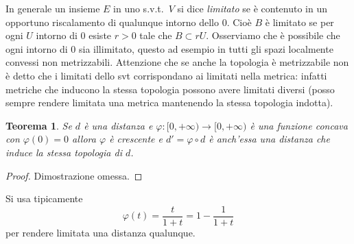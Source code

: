 \documentclass[italian,a4paper,oneside,headinclude]{scrbook}
\renewcommand{\phi}{\varphi}
\newtheorem{theorem}{Teorema}
\begin{document}
In generale un insieme $E$ in uno s.v.t.\ $V$ si dice \emph{limitato}
se è contenuto in un opportuno riscalamento di qualunque intorno dello
$0$.
Cioè $B$ è limitato se per ogni $U$ intorno di $0$ esiste $r>0$ tale
che $B\subset r U$.
Osserviamo che è possibile che ogni intorno di $0$ sia illimitato, questo
ad esempio in tutti gli spazi localmente convessi non metrizzabili.
Attenzione che se anche la topologia è metrizzabile non è detto che i
limitati dello svt corrispondano ai limitati nella metrica: infatti
metriche che inducono la stessa topologia possono avere limitati
diversi (posso sempre rendere limitata una metrica mantenendo la
stessa topologia indotta).

\begin{theorem}\label{th:distanza_concava}
  Se $d$ è una distanza e $\phi\colon[0,+\infty)\to[0,+\infty)$ è una
      funzione concava con $\phi(0)=0$ allora $\phi$ è crescente e
      $d'=\phi\circ d$ è
      anch'essa una distanza che induce la stessa topologia di $d$.
\end{theorem}
\begin{proof}
  Dimostrazione omessa.
\end{proof}

Si usa tipicamente
\[
\phi(t) = \frac{t}{1+t} = 1-\frac{1}{1+t}
\]
per rendere limitata una distanza qualunque.



\end{document}
